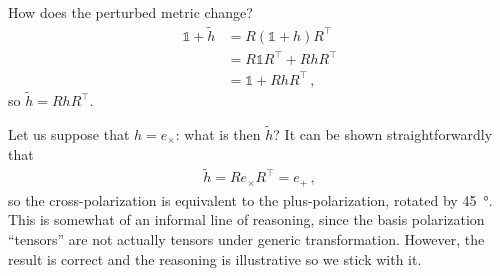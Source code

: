 \documentclass[main.tex]{subfiles}
\begin{document}
How does the perturbed metric change? 
%
\begin{align}
\mathbb{1} + \widetilde{h} &= R (\mathbb{1} + h) R^{\top}  \\
&= R \mathbb{1} R^{\top} + R h R^{\top}  \\
&= \mathbb{1} + R h R^{\top} 
\,,
\end{align}
%
so \(\widetilde{h} = R h R^{\top}\). 

Let us suppose that \(h = e_{ \times }\): what is then \(\widetilde{h}\)? It can be shown straightforwardly that 
%
\begin{align}
\widetilde{h} = R e_{ \times } R^{\top} = e_{+}
\,,
\end{align}
%
so the cross-polarization is equivalent to the plus-polarization, rotated by \SI{45}{\degree}. 
This is somewhat of an informal line of reasoning, since the basis polarization ``tensors'' are not actually tensors under generic transformation. However, the result is correct and the reasoning is illustrative so we stick with it.
\end{document}
